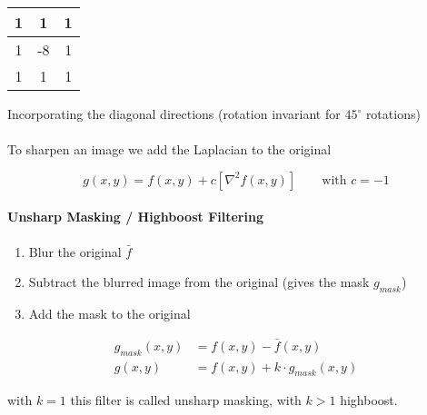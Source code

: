 \begin{tabular}{|c|c|c|} \hline
1 & 1 & 1 \\ \hline
1 &-8 & 1 \\ \hline
1 & 1 & 1 \\ \hline
\end{tabular}
Incorporating the diagonal directions (rotation invariant for $45^\circ$ rotations)
\\ \\
To sharpen an image we add the Laplacian to the original

\begin{equation}
g(x,y) = f(x,y) + c \left[ \nabla^2f(x,y) \right] \qquad \textrm{with } c=-1
\end{equation}

\newpage
\paragraph{Unsharp Masking / Highboost Filtering }
\begin{enumerate}
\item Blur the original $\bar{f}$
\item Subtract the blurred image from the original (gives the mask $g_{mask}$)
\item Add the mask to the original
\end{enumerate}
\begin{align}
g_{mask}(x,y) &= f(x,y) - \bar{f}(x,y) \\
g(x,y) &= f(x,y) + k \cdot g_{mask}(x,y)
\end{align}

with $k=1$ this filter is called unsharp masking, with $k>1$ highboost.

